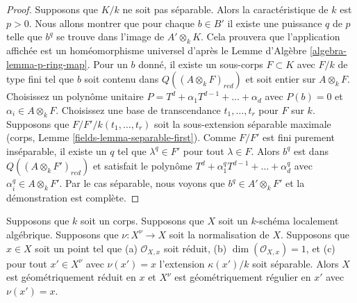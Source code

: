 \begin{proof}
\medskip\noindent
Supposons que $K/k$ ne soit pas séparable. Alors la
caractéristique de $k$ est $p > 0$. Nous allons montrer que pour
chaque $b \in B'$ il existe une puissance $q$ de $p$ telle que
$b^q$ se trouve dans l'image de $A' \otimes_k K$. Cela prouvera que
l'application affichée est un homéomorphisme universel d'après le
Lemme d'Algèbre \ref{algebra-lemma-p-ring-map}. Pour un $b$ donné,
il existe un sous-corps $F \subset K$ avec $F/k$ de type fini tel
que $b$ soit contenu dans $Q((A \otimes_k F)_{red})$ et soit entier
sur $A \otimes_k F$. Choisissez un polynôme unitaire $P = T^d +
\alpha_1 T^{d - 1} + \ldots + \alpha _d$ avec $P(b) = 0$ et
$\alpha_i \in A \otimes_k F$. Choisissez une base de transcendance
$t_1, \ldots, t_r$ pour $F$ sur $k$. Supposons que $F/F'/k(t_1,
\ldots, t_r)$ soit la sous-extension séparable maximale (corps, Lemme
\ref{fields-lemma-separable-first}). Comme $F/F'$ est fini purement
inséparable, il existe un $q$ tel que $\lambda^q \in F'$ pour tout
$\lambda \in F$. Alors $b^q$ est dans $Q((A \otimes_k F')_{red})$ et
satisfait le polynôme $T^d + \alpha_1^q T^{d - 1} + \ldots + \alpha
_d^q$ avec $\alpha_i^q \in A \otimes_k F'$. Par le cas séparable, nous
voyons que $b^q \in A' \otimes_k F'$ et la démonstration est complète.
\end{proof}

\begin{lemma}
\label{lemma-geometrically-normal-in-codim-1}
Supposons que $k$ soit un corps. Supposons que $X$ soit un $k$-schéma
localement algébrique. Supposons que $\nu : X^\nu \to X$ soit la
normalisation de $X$. Supposons que $x \in X$ soit un point tel que
(a) $\mathcal{O}_{X, x}$ soit réduit, (b) $\dim(\mathcal{O}_{X, x}) =
1$, et (c) pour tout $x' \in X^\nu$ avec $\nu(x') = x$ l'extension
$\kappa(x')/k$ soit séparable. Alors $X$ est géométriquement réduit en
$x$ et $X^\nu$ est géométriquement régulier en $x'$ avec $\nu(x') = x$.
\end{lemma}

